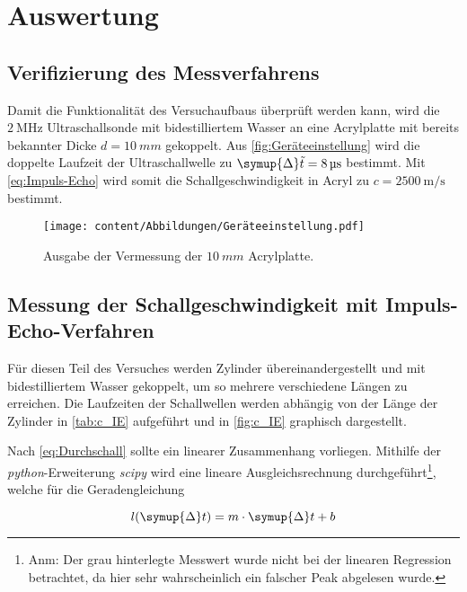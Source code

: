 \section{Auswertung}
\label{sec:Auswertung}

\subsection{Verifizierung des Messverfahrens}
\label{sec:Verifizierung des Messverfahrens}
Damit die Funktionalität des Versuchaufbaus überprüft werden kann, wird die $\qty{2}{\mega\hertz}$ Ultraschallsonde mit bidestilliertem Wasser an 
eine Acrylplatte mit bereits bekannter Dicke $d=\qty{10}{mm}$ gekoppelt. Aus \autoref{fig:Geräteeinstellung} wird die doppelte Laufzeit der 
Ultraschallwelle zu $\symup{\Delta}\tilde{t}=\qty{8}{\micro\second}$ bestimmt. Mit \eqref{eq:Impuls-Echo} wird somit die Schallgeschwindigkeit in Acryl
zu $c=\qty{2500}{\metre\per\second}$ bestimmt.
\begin{figure}[H]
  \centering
  \texttt{[image: content/Abbildungen/Geräteeinstellung.pdf]}
  \caption{Ausgabe der Vermessung der $\qty{10}{mm}$ Acrylplatte.}
  \label{fig:Geräteeinstellung}
\end{figure}

\subsection{Messung der Schallgeschwindigkeit mit Impuls-Echo-Verfahren}
\label{sec:c_IE}
Für diesen Teil des Versuches werden Zylinder übereinandergestellt und mit bidestilliertem Wasser gekoppelt, um so mehrere verschiedene Längen 
zu erreichen. Die Laufzeiten der Schallwellen werden abhängig von der Länge der Zylinder in \autoref{tab:c_IE} aufgeführt und in \autoref{fig:c_IE}
graphisch dargestellt.

Nach \eqref{eq:Durchschall} sollte ein linearer Zusammenhang vorliegen. Mithilfe der \textit{python}-Erweiterung \textit{scipy}\cite{scipy} wird eine
lineare Ausgleichsrechnung durchgeführt\footnote{Anm: Der grau hinterlegte Messwert %
wurde nicht bei der linearen Regression betrachtet, da hier sehr wahrscheinlich ein falscher Peak abgelesen wurde.}, welche für die Geradengleichung

\begin{equation*}
  l(\symup{\Delta}t) = m \cdot \symup{\Delta}t + b
\end{equation*}

